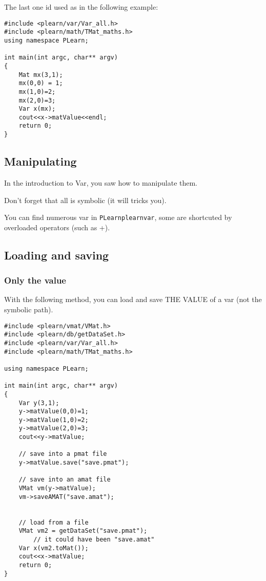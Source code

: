 \documentclass[11pt]{book}
\begin{document}
The last one id used as in the following example:
\begin{verbatim}
#include <plearn/var/Var_all.h>
#include <plearn/math/TMat_maths.h>
using namespace PLearn;

int main(int argc, char** argv)
{
    Mat mx(3,1);
    mx(0,0) = 1;
    mx(1,0)=2;
    mx(2,0)=3;
    Var x(mx);
    cout<<x->matValue<<endl;
    return 0;
}
\end{verbatim}

\subsection{Manipulating}

In the introduction to Var, you saw how to manipulate them.

Don't forget that all is symbolic (it will tricks you).

You can find numerous var in \texttt{PLearn\/plearn\/var}, some are
shortcuted by overloaded operators (such as +).

\subsection{Loading and saving}

\subsubsection{Only the value}

With the following method, you can load and save THE VALUE of a var (not
the symbolic path).
\begin{verbatim}
#include <plearn/vmat/VMat.h>
#include <plearn/db/getDataSet.h>
#include <plearn/var/Var_all.h>
#include <plearn/math/TMat_maths.h>

using namespace PLearn;

int main(int argc, char** argv)
{
    Var y(3,1);
    y->matValue(0,0)=1;
    y->matValue(1,0)=2;
    y->matValue(2,0)=3;
    cout<<y->matValue;

    // save into a pmat file
    y->matValue.save("save.pmat");

    // save into an amat file
    VMat vm(y->matValue);
    vm->saveAMAT("save.amat");


    // load from a file
    VMat vm2 = getDataSet("save.pmat");
        // it could have been "save.amat"
    Var x(vm2.toMat());
    cout<<x->matValue;
    return 0;
}
\end{verbatim}
\end{document}
